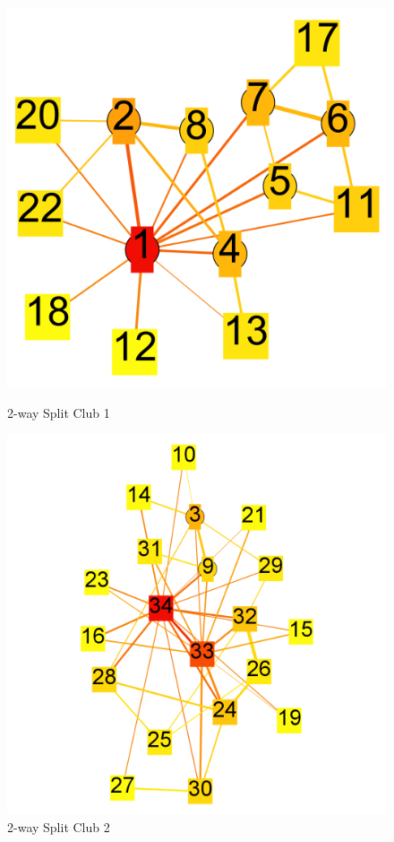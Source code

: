 \documentclass[paper=a4, fontsize=11pt]{scrartcl} %
\numberwithin{equation}{section} %
\numberwithin{figure}{section} %
\numberwithin{table}{section} %
\begin{document}
\begin{figure}[H]
\centering
\begin{minipage}{.5\textwidth}
  \centering
\includegraphics[width=1\textwidth]{weighted/club1}
\caption{2-way Split Club 1}
\label{fig:club1}
\end{minipage}%
\begin{minipage}{.5\textwidth}
  \centering
\includegraphics[width=1\textwidth]{weighted/club2}
\caption{2-way Split Club 2}
\label{fig:club2}
\end{minipage}
\end{figure}
\end{document}
